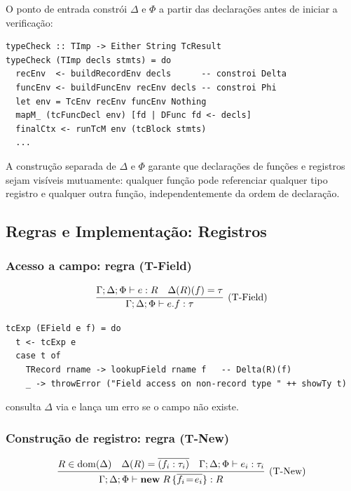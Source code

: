 O ponto de entrada constrói \(\Delta\) e \(\Phi\) a partir das
declarações antes de iniciar a verificação:

\begin{verbatim}
typeCheck :: TImp -> Either String TcResult
typeCheck (TImp decls stmts) = do
  recEnv  <- buildRecordEnv decls      -- constroi Delta
  funcEnv <- buildFuncEnv recEnv decls -- constroi Phi
  let env = TcEnv recEnv funcEnv Nothing
  mapM_ (tcFuncDecl env) [fd | DFunc fd <- decls]
  finalCtx <- runTcM env (tcBlock stmts)
  ...
\end{verbatim}

A construção separada de \(\Delta\) e \(\Phi\) garante que
declarações de funções e registros sejam visíveis mutuamente:
qualquer função pode referenciar qualquer tipo registro e qualquer
outra função, independentemente da ordem de declaração.

\subsection{Regras e Implementação: Registros}

\subsubsection{Acesso a campo: regra (T-Field)}

\[
  \infer[\text{(T-Field)}]
  {\Gamma;\Delta;\Phi \vdash e.f : \tau}
  {\Gamma;\Delta;\Phi \vdash e : R \quad \Delta(R)(f) = \tau}
\]

\begin{verbatim}
tcExp (EField e f) = do
  t <- tcExp e
  case t of
    TRecord rname -> lookupField rname f   -- Delta(R)(f)
    _ -> throwError ("Field access on non-record type " ++ showTy t)
\end{verbatim}

 consulta \(\Delta\) via
 e lança um erro se o campo não existe.

\subsubsection{Construção de registro: regra (T-New)}

\[
  \infer[\text{(T-New)}]
  {\Gamma;\Delta;\Phi \vdash \mathbf{new}\;R\,\{\overline{f_i\!=\!e_i}\}: R}
  {R \in \mathrm{dom}(\Delta)
    \quad \Delta(R) = \overline{(f_i:\tau_i)}
  \quad \Gamma;\Delta;\Phi \vdash e_i : \tau_i}
\]

